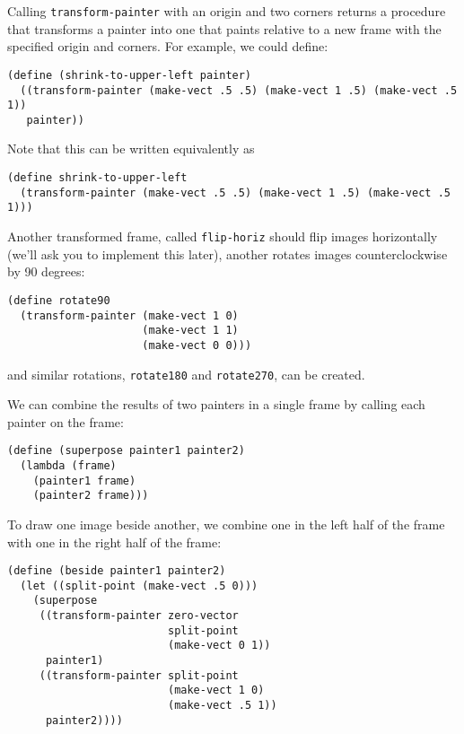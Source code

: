 \noindent
Calling {\tt transform-painter} with an origin and two corners
returns a procedure that transforms a painter into one that paints
relative to a new frame with the specified origin and corners.  For
example, we could define:\\
\begin{verbatim}
(define (shrink-to-upper-left painter)
  ((transform-painter (make-vect .5 .5) (make-vect 1 .5) (make-vect .5 1))
   painter))
\end{verbatim}

\noindent
Note that this can be written equivalently as\\
\begin{verbatim}
(define shrink-to-upper-left
  (transform-painter (make-vect .5 .5) (make-vect 1 .5) (make-vect .5 1)))
\end{verbatim}

Another transformed frame, called {\tt flip-horiz} should flip images
horizontally (we'll ask you to implement this later), another 
rotates images counterclockwise by 90 degrees:\\
\begin{verbatim}
(define rotate90
  (transform-painter (make-vect 1 0)
                     (make-vect 1 1)
                     (make-vect 0 0)))
\end{verbatim}
and similar rotations, {\tt rotate180} and {\tt rotate270}, can be created.

We can combine the results of two painters in a single frame by
calling each painter on the frame:

\begin{verbatim}
(define (superpose painter1 painter2)
  (lambda (frame)
    (painter1 frame)
    (painter2 frame)))
\end{verbatim}

To draw one image beside another, we combine one in the left half
of the frame with one in the right half of the frame:

\begin{verbatim}
(define (beside painter1 painter2)
  (let ((split-point (make-vect .5 0)))
    (superpose
     ((transform-painter zero-vector
                         split-point
                         (make-vect 0 1))
      painter1)
     ((transform-painter split-point
                         (make-vect 1 0)
                         (make-vect .5 1))
      painter2))))

\end{verbatim}

